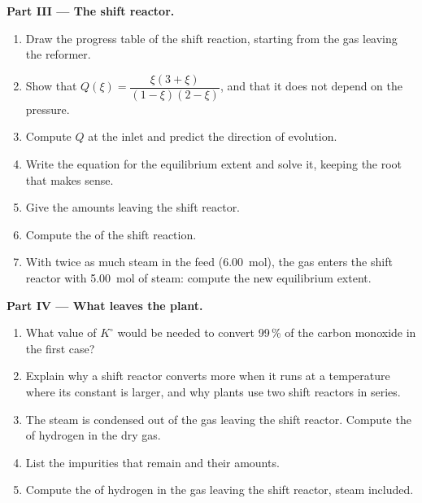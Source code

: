 \begin{problem}
\medskip
\noindent\textbf{Part III --- The shift reactor.}
\begin{enumerate}[resume]
  \item Draw the progress table of the shift reaction, starting from the
        gas leaving the reformer.
  \item Show that $Q(\xi) = \dfrac{\xi(3 + \xi)}{(1 - \xi)(2 - \xi)}$, and
        that it does not depend on the pressure.
  \item Compute $Q$ at the inlet and predict the direction of evolution.
  \item Write the equation for the equilibrium extent and solve it,
        keeping the root that makes sense.
  \item Give the amounts leaving the shift reactor.
  \item Compute the  of the shift reaction.
  \item With twice as much steam in the feed (\qty{6.00}{mol}), the gas
        enters the shift reactor with \qty{5.00}{mol} of steam: compute the
        new equilibrium extent.
\end{enumerate}

\medskip
\noindent\textbf{Part IV --- What leaves the plant.}
\begin{enumerate}[resume]
  \item What value of $K^\circ$ would be needed to convert 99\,\% of the
        carbon monoxide in the first case?
  \item Explain why a shift reactor converts more when it runs at a
        temperature where its constant is larger, and why plants use two
        shift reactors in series.
  \item The steam is condensed out of the gas leaving the shift reactor.
        Compute the  of hydrogen in the dry gas.
  \item List the impurities that remain and their amounts.
  \item Compute the  of hydrogen in the gas leaving the shift
        reactor, steam included.
\end{enumerate}
\end{problem}
